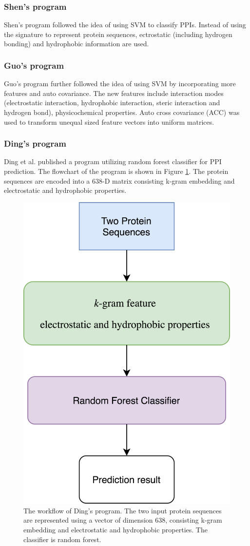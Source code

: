 \subsubsection{Shen's program}
Shen's program \cite{Shen07_PPIpred} followed the idea of using SVM to classify PPIs. Instead of using the signature to represent protein sequences, ectrostatic (including hydrogen bonding) and hydrophobic information are used.
\subsubsection{Guo's program}
Guo's program \cite{guo2010pred_ppi} further followed the idea of using SVM by incorporating more features and auto covariance. The new features include interaction modes (electrostatic interaction, hydrophobic interaction, steric interaction and hydrogen bond), physicochemical properties. Auto cross covariance (ACC) was used to transform unequal sized feature vectors into uniform matrices. 

\subsubsection{Ding's program}
Ding et al. \cite{ding2016predicting} published a program utilizing random forest classifier for PPI prediction. The flowchart of the program is shown in Figure \ref{fig_Ding}. The protein sequences are encoded into a 638-D matrix consisting k-gram embedding and electrostatic and hydrophobic properties.
\begin{figure}[h!]
\begin{center}
\includegraphics[height =7 cm]{img/Ding.png}
\caption[The workflow of Ding's program]{The workflow of Ding's program. The two input protein sequences are represented using a vector of dimension 638, consisting k-gram embedding and electrostatic and hydrophobic properties. The classifier is random forest. \label{fig_Ding}}
\end{center}
\end{figure} 
